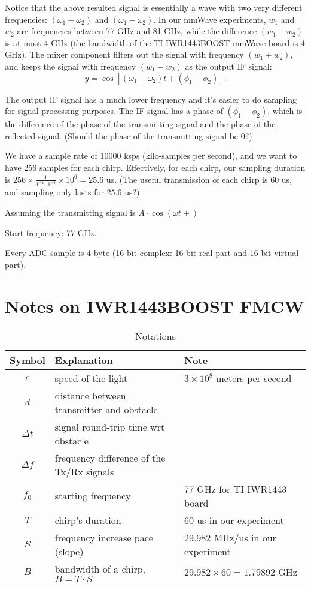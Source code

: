 \documentclass[11pt, oneside]{article}   	%
\begin{document}
Notice that the above resulted signal is essentially a wave with two very different frequencies: $(\omega_1 + \omega_2)$ and $(\omega_1 - \omega_2)$. In our mmWave experiments, $w_1$ and $w_2$ are frequencies between 77 GHz and 81 GHz, while the difference $(w_1 - w_2)$ is at most 4 GHz (the bandwidth of the TI IWR1443BOOST mmWave board is 4 GHz). The mixer component filters out the signal with frequency $(w_1 + w_2)$, and keeps the signal with frequency  $(w_1 - w_2)$ as the output IF signal:
$$y = \cos\left[(\omega_1 - \omega_2) t + (\phi_1 - \phi_2)\right].$$

The output IF signal has a much lower frequency and it's easier to do sampling for signal processing purposes. The IF signal has a phase of $(\phi_1 - \phi_2)$, which is the difference of the phase of the transmitting signal and the phase of the reflected signal. (Should the phase of the transmitting signal be 0?)

We have a sample rate of 10000 ksps (kilo-samples per second), and we want to have 256 samples for each chirp. Effectively, for each chirp, our sampling duration is $256\times\frac{1}{10^4\cdot 10^3}\times 10^6 = 25.6$ us. (The useful transmission of each chirp is 60 us, and sampling only lasts for 25.6 us?)

Assuming the transmitting signal is $A\cdot \cos(\omega t + )$

Start frequency: 77 GHz.

Every ADC sample is 4 byte (16-bit complex: 16-bit real part and 16-bit virtual part).


\section{Notes on IWR1443BOOST FMCW}

\begin{table}[t]
\centering
\caption{Notations}
\label{tab:notation}
\vspace{4pt}
\begin{tabular}{c|l|l}
\hline
\textbf{Symbol} & \textbf{Explanation} & \textbf{\centering Note} \\
\hline
\hline
$c$ & speed of the light & $3\times 10^8$ meters per second\\
\hline
$d$ & distance between transmitter and obstacle & \\
\hline
$\Delta t$ &signal round-trip time wrt obstacle & \\
\hline
$\Delta f$ & frequency difference of the Tx/Rx signals & \\
\hline
$f_0$ & starting frequency & 77 GHz for TI IWR1443 board \\
\hline
$T$ & chirp's duration & 60 us in our experiment \\
\hline
$S$ & frequency increase pace (slope) & 29.982 MHz/us in our experiment\\
\hline
$B$ & bandwidth of a chirp, $B=T\cdot S$ & $29.982 \times 60 = 1.79892$ GHz \\
\hline
\end{tabular}
\end{table}
\end{document}
